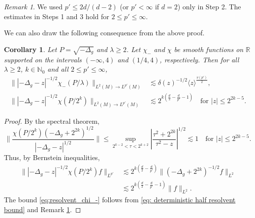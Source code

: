 \documentclass[12pt,reqno]{amsart}
\newtheorem{corollary}[theorem]{Corollary}
\theoremstyle{definition}
\theoremstyle{remark}
\newtheorem{remark}[theorem]{Remark}
\numberwithin{equation}{section}
\newcommand{\1}{\mathbbm{1}}
\newcommand{\N}{\mathbb{N}}
\newcommand{\R}{\mathbb{R}}
\begin{document}
\begin{remark}\label{rem:p'}
We used $p'\leq 2d/(d-2)$ (or $p'<\infty$ if $d=2$) only in Step 2. The estimates in Steps 1 and 3 hold for $2\leq p'\leq \infty$.

\end{remark}

We can also draw the following consequence from the above proof.

\begin{corollary}\label{cor:resolvent_bound_cutoffs}
 Let $P=\sqrt{-\Delta_g}$ and $\lambda\geq 2$. Let $\chi_-$ and $\chi$ be smooth functions on $\R$ supported on the intervals $(-\infty,4)$ and $(1/4,4)$, respectively. Then for all $\lambda\geq 2$, $k\in\N_0$ and all $2\leq p'\leq\infty$,
 \begin{align}
 \||-\Delta_g-z|^{-1/2}\chi_-(P/\lambda)\|_{L^{2}(M)\to L^{p'}(M)}&\lesssim 
 \delta(z)^{-1/2} \langle z\rangle^{\frac{\nu(p')}{2}},\label{eq:resolvent_chi_-}\\
 \||-\Delta_g-z|^{-1/2}\chi(P/2^k)\|_{L^{2}(M)\to L^{p'}(M)}&\lesssim 2^{k(\frac{d}{2}-\frac{d}{p'}-1)}\quad \mbox{for } |z|\leq 2^{2k-5}.\label{eq:resolvent_chi_k}
 \end{align} 
\end{corollary}

\begin{proof}
 By the spectral theorem,
   \[
    \Big\|\frac{\chi(P/2^k)(-\Delta_g+2^{2k})^{1/2}}{|-\Delta_g-z|^{1/2}}\Big\|\leq\sup_{2^{k-2}<\tau<2^{k+2}}\left|\frac{\tau^2+2^{2k}}{\tau^2-z}\right|^{1/2}\lesssim 1\quad \mbox{for } |z|\leq 2^{2k-5}. 
  \]
  Thus, by Bernstein inequalities,
  \begin{align*}
    \||-\Delta_g-z|^{-1/2}\chi(P/2^k)f\|_{L^{p'}}
    & \lesssim 2^{k(\frac{d}{2}-\frac{d}{p'})} \|(-\Delta_g+2^{2k})^{-1/2}f\|_{L^{2}} \\
    & \lesssim 2^{k(\frac{d}{2}-\frac{d}{p'}-1)} \|f\|_{L^2}.
  \end{align*}
The bound \eqref{eq:resolvent_chi_-} follows from \eqref{eq: deterministic half resolvent bound} and Remark \ref{rem:p'}.
\end{proof}
\end{document}
